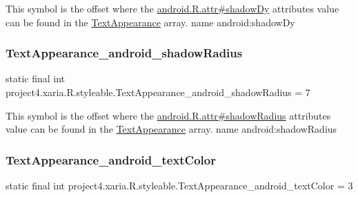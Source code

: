 This symbol is the offset where the \hyperlink{}{android.\+R.\+attr\#shadow\+Dy} attribute\textquotesingle{}s value can be found in the \hyperlink{classproject4_1_1xaria_1_1R_1_1styleable_a324a4bda63d9f00d154e0a6c1eb718b0}{Text\+Appearance} array.  name android\+:shadow\+Dy \mbox{\label{classproject4_1_1xaria_1_1R_1_1styleable_ae958e2bce5916596d134543faa936c61}} 
\subsubsection{\texorpdfstring{Text\+Appearance\+\_\+android\+\_\+shadow\+Radius}{TextAppearance\_android\_shadowRadius}}
{\footnotesize\ttfamily static final int project4.\+xaria.\+R.\+styleable.\+Text\+Appearance\+\_\+android\+\_\+shadow\+Radius = 7\hspace{0.3cm}{\ttfamily [static]}}

This symbol is the offset where the \hyperlink{}{android.\+R.\+attr\#shadow\+Radius} attribute\textquotesingle{}s value can be found in the \hyperlink{classproject4_1_1xaria_1_1R_1_1styleable_a324a4bda63d9f00d154e0a6c1eb718b0}{Text\+Appearance} array.  name android\+:shadow\+Radius \mbox{\label{classproject4_1_1xaria_1_1R_1_1styleable_a2b25c50bd5f9e42c5a9fc5afb3dbcb37}} 
\subsubsection{\texorpdfstring{Text\+Appearance\+\_\+android\+\_\+text\+Color}{TextAppearance\_android\_textColor}}
{\footnotesize\ttfamily static final int project4.\+xaria.\+R.\+styleable.\+Text\+Appearance\+\_\+android\+\_\+text\+Color = 3\hspace{0.3cm}{\ttfamily [static]}}

